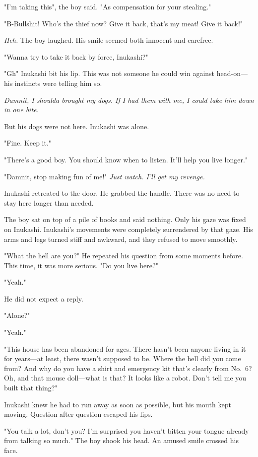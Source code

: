 "I'm taking this", the boy said. "As compensation for your stealing."

"B-Bullshit! Who's the thief now? Give it back, that's my meat! Give it
back!"

\emph{Heh.} The boy laughed. His smile seemed both innocent and carefree.

"Wanna try to take it back by force, Inukashi?"

"Gh\el " Inukashi bit his lip. This was not someone he could win against
head-on---his instincts were telling him so.

\emph{Damnit, I shoulda brought my dogs. If I had them with me, I could take
him down in one bite.}

But his dogs were not here. Inukashi was alone.

"\el Fine. Keep it."

"There's a good boy. You should know when to listen. It'll help you live
longer."

"Damnit, stop making fun of me!" \emph{Just watch. I'll get my revenge.}

Inukashi retreated to the door. He grabbed the handle. There was no need
to stay here longer than needed.

The boy sat on top of a pile of books and said nothing. Only his gaze
was fixed on Inukashi. Inukashi's movements were completely surrendered
by that gaze. His arms and legs turned stiff and awkward, and they
refused to move smoothly.

"\el What the hell are you\el ?" He repeated his question from some
moments before. This time, it was more serious. "Do you live here?"

"Yeah."

He did not expect a reply.

"Alone?"

"Yeah."

"This house has been abandoned for ages. There hasn't been anyone living
in it for years---at least, there wasn't supposed to be. Where the hell
did you come from? And why do you have a shirt and emergency kit that's
clearly from No.~6? Oh, and that mouse doll---what is that? It looks like
a robot. Don't tell me you built that thing?"

Inukashi knew he had to run away as soon as possible, but his mouth kept
moving. Question after question escaped his lips.

"You talk a lot, don't you? I'm surprised you haven't bitten your tongue
already from talking so much." The boy shook his head. An amused smile
crossed his face.

